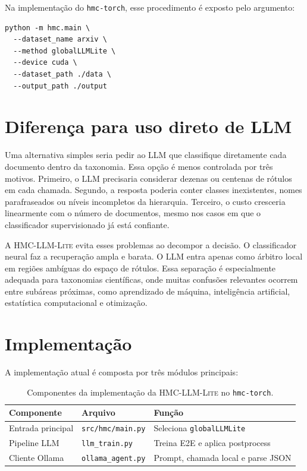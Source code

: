 \documentclass[11pt,a4paper]{article}
\newcommand{\method}{\textsc{HMC-LLM-Lite}}
\newcommand{\repo}{\texttt{hmc-torch}}
\begin{document}
Na implementação do \repo, esse procedimento é exposto pelo argumento:

\begin{verbatim}
python -m hmc.main \
  --dataset_name arxiv \
  --method globalLLMLite \
  --device cuda \
  --dataset_path ./data \
  --output_path ./output
\end{verbatim}

\section{Diferença para uso direto de LLM}

Uma alternativa simples seria pedir ao LLM que classifique diretamente cada
documento dentro da taxonomia. Essa opção é menos controlada por três motivos.
Primeiro, o LLM precisaria considerar dezenas ou centenas de rótulos em cada
chamada. Segundo, a resposta poderia conter classes inexistentes, nomes
parafraseados ou níveis incompletos da hierarquia. Terceiro, o custo cresceria
linearmente com o número de documentos, mesmo nos casos em que o classificador
supervisionado já está confiante.

A \method{} evita esses problemas ao decompor a decisão. O classificador neural
faz a recuperação ampla e barata. O LLM entra apenas como árbitro local em
regiões ambíguas do espaço de rótulos. Essa separação é especialmente adequada
para taxonomias científicas, onde muitas confusões relevantes ocorrem entre
subáreas próximas, como aprendizado de máquina, inteligência artificial,
estatística computacional e otimização.

\section{Implementação}

A implementação atual é composta por três módulos principais:

\begin{table}[htbp]
\centering
\begin{tabular}{lll}
\toprule
\textbf{Componente} & \textbf{Arquivo} & \textbf{Função} \\
\midrule
Entrada principal & \texttt{src/hmc/main.py} & Seleciona \texttt{globalLLMLite} \\
Pipeline LLM & \texttt{llm\_train.py} & Treina E2E e aplica postprocess \\
Cliente Ollama & \texttt{ollama\_agent.py} & Prompt, chamada local e parse JSON \\
\bottomrule
\end{tabular}
\caption{Componentes da implementação da \method{} no \repo.}
\label{tab:implementation}
\end{table}
\end{document}
